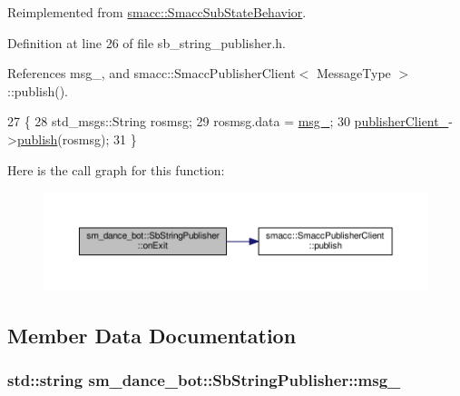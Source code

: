 Reimplemented from \hyperlink{classsmacc_1_1SmaccSubStateBehavior_afaeb44666136c5ae47a53dde89fa5d31}{smacc\+::\+Smacc\+Sub\+State\+Behavior}.



Definition at line 26 of file sb\+\_\+string\+\_\+publisher.\+h.



References msg\+\_\+, and smacc\+::\+Smacc\+Publisher\+Client$<$ Message\+Type $>$\+::publish().


\begin{DoxyCode}
27     \{
28         std\_msgs::String rosmsg;
29         rosmsg.data = \hyperlink{classsm__dance__bot_1_1SbStringPublisher_ad2ed2eadf87a57cce9c8fd4bc80bb8d3}{msg\_};
30         \hyperlink{classsm__dance__bot_1_1SbStringPublisher_ab24c4e17860a4a329df0ccc835486cbe}{publisherClient\_}->\hyperlink{classsmacc_1_1SmaccPublisherClient_aa635210d9104a5b6f3ea15cb2bf16518}{publish}(rosmsg);
31     \}
\end{DoxyCode}


Here is the call graph for this function\+:
\nopagebreak
\begin{figure}[H]
\begin{center}
\leavevmode
\includegraphics[width=350pt]{classsm__dance__bot_1_1SbStringPublisher_ac98b1befbcf67d2e7c175faec5fcd2d5_cgraph}
\end{center}
\end{figure}




\subsection{Member Data Documentation}
\subsubsection[{\texorpdfstring{msg\+\_\+}{msg_}}]{\setlength{\rightskip}{0pt plus 5cm}std\+::string sm\+\_\+dance\+\_\+bot\+::\+Sb\+String\+Publisher\+::msg\+\_\+}\hypertarget{classsm__dance__bot_1_1SbStringPublisher_ad2ed2eadf87a57cce9c8fd4bc80bb8d3}{}\label{classsm__dance__bot_1_1SbStringPublisher_ad2ed2eadf87a57cce9c8fd4bc80bb8d3}


